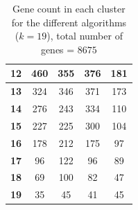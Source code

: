 \begin{table}[H]
\begin{tabular}{lcccc}
		\textbf{12}      & 460              & 355                & 376                 & 181                 \\ \hline
		\textbf{13}      & 324              & 346                & 371                 & 173                 \\ \hline
		\textbf{14}      & 276              & 243                & 334                 & 110                 \\ \hline
		\textbf{15}      & 227              & 225                & 300                 & 104                 \\ \hline
		\textbf{16}      & 178              & 212                & 175                 & 97                  \\ \hline
		\textbf{17}      & 96               & 122                & 96                  & 89                  \\ \hline
		\textbf{18}      & 69               & 100                & 82                  & 47                  \\ \hline
		\textbf{19}      & 35               & 45                 & 41                  & 45                  \\ \hline
	\end{tabular}
	\caption{Gene count in each cluster for the different algorithms \\
	($k=19$), total number of genes = $8675$}
	\label{tab: number of genes RNA Crude}
\end{table}

